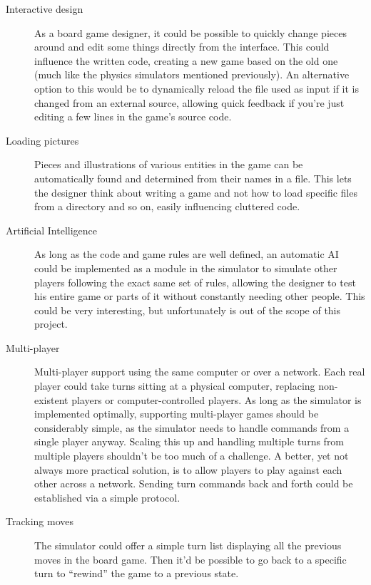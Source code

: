 \begin{description}
  \item[Interactive design] As a board game designer, it could be possible to
    quickly change pieces around and edit some things directly from the
    interface. This could influence the written code, creating a new game based
    on the old one (much like the physics simulators mentioned previously).
    An alternative option to this would be to dynamically reload the file used
    as input if it is changed from an external source, allowing quick feedback
    if you're just editing a few lines in the game's source code.

  \item[Loading pictures] Pieces and illustrations of various entities in the
    game can be automatically found and determined from their names in a
    \productname{} file. This lets the designer think about writing a game and
    not how to load specific files from a directory and so on, easily
    influencing cluttered code.

  \item[Artificial Intelligence] As long as the code and game rules are well
    defined, an automatic AI could be implemented as a module in the simulator
    to simulate other players following the exact same set of rules, allowing
    the designer to test his entire game or parts of it without constantly
    needing other people. This could be very interesting, but unfortunately is
    out of the scope of this project.

  \item[Multi-player] Multi-player support using the same computer or over a
    network. Each real player could take turns sitting at a physical computer,
    replacing non-existent players or computer-controlled players. As long as
    the simulator is implemented optimally, supporting multi-player games should
    be considerably simple, as the simulator needs to handle commands from a
    single player anyway. Scaling this up and handling multiple turns from
    multiple players shouldn't be too much of a challenge. A better, yet not
    always more practical solution, is to allow players to play against each
    other across a network. Sending turn commands back and forth could be
    established via a simple protocol.

  \item[Tracking moves] The simulator could offer a simple turn list displaying
    all the previous moves in the board game. Then it'd be possible to go back
    to a specific turn to ``rewind'' the game to a previous state.
\end{description}


